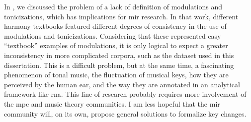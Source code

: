 
In \textcite{napoleslopez2020local}, we discussed the
problem of a lack of definition of modulations and
tonicizations, which has implications for \gls{mir}
research. In that work, different harmony textbooks featured
different degrees of consistency in the use of modulations
and tonicizations. Considering that these represented  easy
``textbook'' examples of modulations, it is only logical to
expect a greater inconsistency in more complicated corpora,
such as the dataset used in this dissertation. This is a
difficult problem, but at the same time, a fascinating
phenomenon of tonal music, the fluctuation of musical keys,
how they are perceived by the human ear, and the way they
are annotated in an analytical framework like \gls{rna}.
This line of research probably requires more involvement of
the \gls{mpc} and music theory communities. I am less
hopeful that the \gls{mir} community will, on its own,
propose general solutions to formalize key changes.
